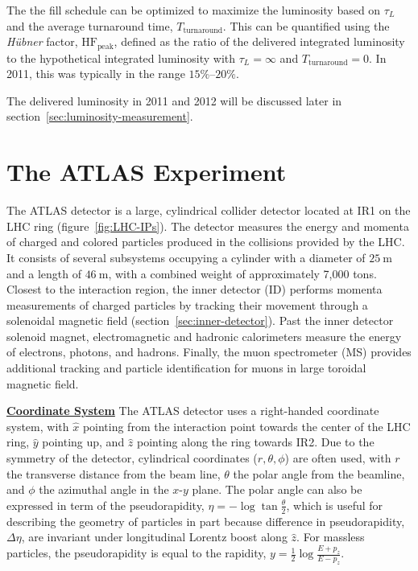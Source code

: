 \begin{itemize}
	The the fill schedule can be optimized to maximize the luminosity based on $\tau_L$ and the average turnaround time, $T_{\mathrm{turnaround}}$. This can be quantified using the \emph{H{\"u}bner} factor, $\mathrm{HF}_{\mathrm{peak}}$, defined as the ratio of the delivered integrated luminosity to the hypothetical integrated luminosity with $\tau_L=\infty$ and $T_{\mathrm{turnaround}}=0$. In 2011, this was typically in the range $15\%$--$20\%$.
\end{itemize}

The delivered luminosity in 2011 and 2012 will be discussed later in section~\ref{sec:luminosity-measurement}.


\section{The ATLAS Experiment}
The ATLAS detector is a large, cylindrical collider detector located at IR1 on the LHC ring (figure~\ref{fig:LHC-IPs}). The detector measures the energy and momenta of charged and colored particles produced in the collisions provided by the LHC. It consists of several subsystems occupying a cylinder with a diameter of $25~\mbox{m}$ and a length of $46~\mbox{m}$, with a combined weight of approximately 7,000 tons. Closest to the interaction region, the inner detector (ID) performs momenta measurements of charged particles by tracking their movement through a solenoidal magnetic field (section~\ref{sec:inner-detector}). Past the inner detector solenoid magnet, electromagnetic and hadronic calorimeters measure the energy of electrons, photons, and hadrons. Finally, the muon spectrometer (MS) provides additional tracking and particle identification for muons in large toroidal magnetic field. 

\underline{\textbf{Coordinate System}}
The ATLAS detector uses a right-handed coordinate system, with $\hat{x}$ pointing from the interaction point towards the center of the LHC ring, $\hat{y}$ pointing up, and $\hat{z}$ pointing along the ring towards IR2. Due to the symmetry of the detector, cylindrical coordinates ($r,\theta,\phi$) are often used, with $r$ the transverse distance from the beam line, $\theta$ the polar angle from the beamline, and $\phi$ the azimuthal angle in the $x$-$y$ plane. The polar angle can also be expressed in term of the pseudorapidity, $\eta = -\log \tan \frac{\theta}{2}$, which is useful for describing the geometry of particles in part because difference in pseudorapidity, $\Delta\eta$, are invariant under longitudinal Lorentz boost along $\hat{z}$. For massless particles, the pseudorapidity is equal to the rapidity, $y=\frac12 \log \frac{E+p_z}{E-p_z}$. 

